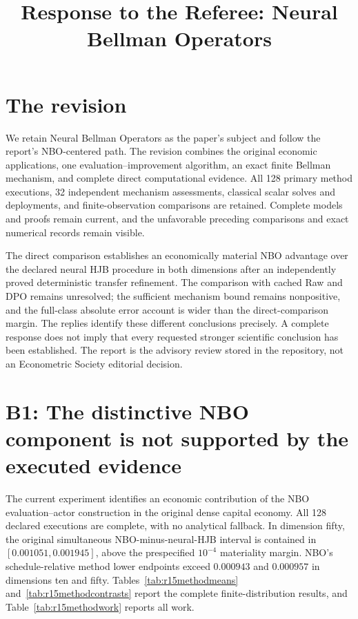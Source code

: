 \begin{frontmatter}
\title{Response to the Referee: Neural Bellman Operators}
\end{frontmatter}
\section*{The revision}
We retain Neural Bellman Operators as the paper's subject and follow the
report's NBO-centered path. The revision combines the original economic
applications, one evaluation--improvement algorithm, an exact finite Bellman
mechanism, and complete direct computational evidence. All 128 primary
method executions, 32 independent mechanism assessments, classical scalar
solves and deployments, and finite-observation comparisons are retained.
Complete models and proofs remain current, and the unfavorable preceding
comparisons and exact numerical records remain visible.

The direct comparison establishes an economically material NBO advantage over
the declared neural HJB procedure in both dimensions after an independently
proved deterministic transfer refinement. The comparison with cached Raw and
DPO remains unresolved; the sufficient mechanism bound remains nonpositive,
and the full-class absolute error account is wider than the direct-comparison
margin. The replies identify these different conclusions precisely. A complete
response does not imply that every requested stronger scientific conclusion
has been established. The report is the advisory review stored in the
repository, not an Econometric Society editorial decision.
\section*{B1: The distinctive NBO component is not supported by the executed evidence}
The current experiment identifies an economic contribution of the NBO evaluation--actor construction in the original dense capital economy. All 128 declared executions are complete, with no analytical fallback. In dimension fifty, the original simultaneous NBO-minus-neural-HJB interval is contained in $[0.001051,0.001945]$, above the prespecified $10^{-4}$ materiality margin. NBO's schedule-relative method lower endpoints exceed $0.000943$ and $0.000957$ in dimensions ten and fifty. Tables~\ref{tab:r15methodmeans} and~\ref{tab:r15methodcontrasts} report the complete finite-distribution results, and Table~\ref{tab:r15methodwork} reports all work.

